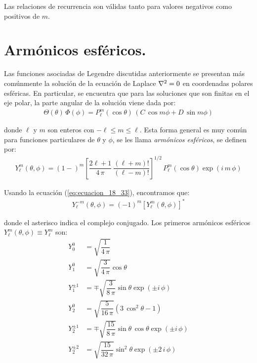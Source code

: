 Las relaciones de recurrencia son válidas tanto para valores negativos como positivos de $m$.

\section{Armónicos esféricos.}

Las funciones asociadas de Legendre discutidas anteriormente se presentan más comúnmente la solución de la ecuación de Laplace $\laplacian =0$ en coordenadas polares esféricas. En particular, se encuentra que para las soluciones que son finitas en el eje polar, la parte angular de la solución viene dada por:
\begin{align*}
\Theta (\theta) \, \Phi (\phi) = P_{\ell}^{m} (\cos \theta) \, (C \,  \cos m \phi + D \, \sin m \phi)
\end{align*}

donde $\ell$ y $m$ son enteros con $- \ell \leq m \leq \ell$. Esta forma general es muy común para funciones particulares de $\theta$ y $\phi$, se les llama \emph{armónicos esféricos}, se definen por:
\begin{align}
Y_{\ell}^{m} (\theta, \phi) = (1-)^{m} \left[ \dfrac{2 \ell + 1}{4 \, \pi} \: \dfrac{(\ell + m)!}{(\ell - m)!} \right]^{1/2} \, P_{\ell}^{m} (\cos \theta) \exp(i \, m \, \phi)
\label{eq:ecuacion_18_45}
\end{align}

Usando la ecuación (\ref{eq:ecuacion_18_33}), encontramos que:
\begin{align*}
Y_{\ell}^{-m} (\theta, \phi) =  (-1)^{m} \left[ Y_{\ell}^{m} (\theta,\phi) \right]^{*}
\end{align*}

donde el asterisco indica el complejo conjugado. Los primeros armónicos esféricos $Y_{\ell}^{m}(\theta,\phi) \equiv Y_{\ell}^{m}$ son:
\begin{align*}
Y_{0}^{0} &= \sqrt{\dfrac{1}{4 \, \pi}} \\[0.5em]
Y_{1}^{0} &= \sqrt{\dfrac{3}{4 \, \pi}} \cos \theta \\[0.5em]
Y_{1}^{\pm 1} &= \mp \sqrt{\dfrac{3}{8 \, \pi}} \sin \theta \exp(\pm i \, \phi) \\[0.5em]
Y_{2}^{0} &= \sqrt{\dfrac{5}{16 \, \pi}} ( 3 \, \cos^{2} \theta - 1) \\[0.5em]
Y_{2}^{\pm 1} &= \mp \sqrt{\dfrac{15}{8 \, \pi}} \sin \theta \, \cos \theta \exp(\pm i \, \phi) \\[0.5em]
Y_{2}^{\pm 2} &= \sqrt{\dfrac{15}{32 \, \pi}} \sin^{2} \theta \exp(\pm 2 \, i \, \phi)
\end{align*}

